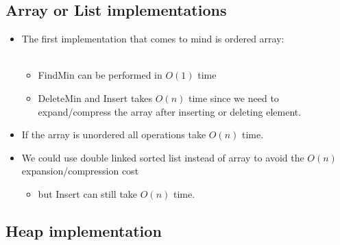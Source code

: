 \documentclass[11pt]{article}
\begin{document}
\subsection{Array or List implementations}
\begin{itemize}
\item The first implementation that comes to mind is ordered array: \\ \\
\centerline{}

        \begin{itemize}
        \item {\sc FindMin} can be performed in $O(1)$ time
        \item {\sc DeleteMin} and {\sc Insert} takes $O(n)$ time since we
        need to expand/compress the array after inserting or deleting element.
        \end{itemize}
\item If the array is unordered all operations take $O(n)$ time.
\item We could use double linked sorted list instead of array to avoid the
$O(n)$ expansion/compression cost
        \begin{itemize}
        \item but {\sc Insert} can still take $O(n)$ time.
        \end{itemize}
\end{itemize}


\subsection{Heap implementation}
\end{document}
